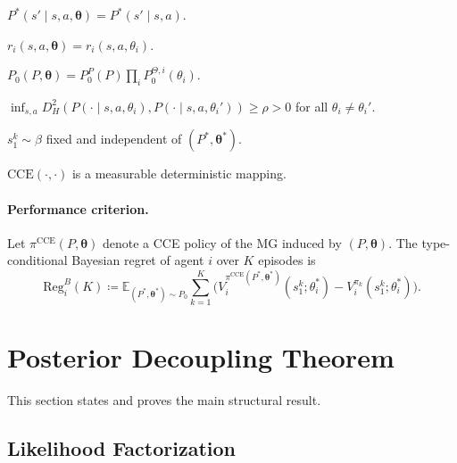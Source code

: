 \begin{assumption}[TI]\label{ass:TI}$P^*(s'\!\mid\! s,a,\boldsymbol\theta)=P^*(s'\!\mid\! s,a)$.\end{assumption}
\begin{assumption}[RL]\label{ass:RL}$r_i(s,a,\boldsymbol\theta)=r_i(s,a,\theta_i)$.\end{assumption}
\begin{assumption}[PF]\label{ass:PF}$P_0(P,\boldsymbol\theta)=P_0^P(P)\prod_i P_0^{\Theta,i}(\theta_i)$.\end{assumption}
\begin{assumption}[TID]\label{ass:TID}$\inf_{s,a}D_H^2(P(\cdot\!\mid\! s,a,\theta_i),P(\cdot\!\mid\! s,a,\theta_i'))\geq\rho>0$ for all $\theta_i\!\neq\!\theta_i'$.\end{assumption}
\begin{assumption}[ISI]\label{ass:ISI}$s_1^k\sim\beta$ fixed and independent of $(P^*,\boldsymbol\theta^*)$.\end{assumption}
\begin{assumption}[CSR]\label{ass:CSR}$\mathrm{CCE}(\cdot,\cdot)$ is a measurable deterministic mapping.\end{assumption}

\paragraph{Performance criterion.} Let $\pi^{\mathrm{CCE}}(P,\boldsymbol\theta)$ denote a CCE policy of the MG induced by $(P,\boldsymbol\theta)$. The type-conditional Bayesian regret of agent $i$ over $K$ episodes is
\begin{equation}
\label{eq:regret-def}
\mathrm{Reg}_i^B(K) \!\coloneqq\! \mathbb{E}_{(P^*,\boldsymbol\theta^*)\sim P_0}\!\sum_{k=1}^K\!\Big(V_i^{\pi^{\mathrm{CCE}}(P^*,\boldsymbol\theta^*)}\!(s_1^k;\theta_i^*) - V_i^{\pi_k}(s_1^k;\theta_i^*)\Big).
\end{equation}

\section{Posterior Decoupling Theorem}
\label{sec:decoupling}

This section states and proves the main structural result.

\subsection{Likelihood Factorization}

